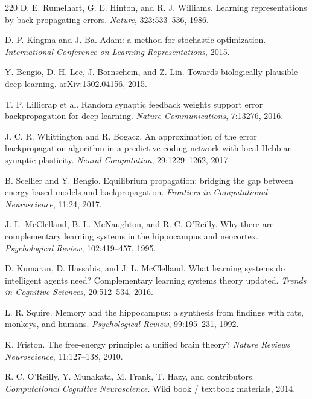\documentclass[11pt]{article}
\newcommand{\1}{\mathbf{1}}
\begin{document}
\begin{thebibliography}{220}
D. E. Rumelhart, G. E. Hinton, and R. J. Williams. Learning representations by back-propagating errors. \emph{Nature}, 323:533--536, 1986.

D. P. Kingma and J. Ba. Adam: a method for stochastic optimization. \emph{International Conference on Learning Representations}, 2015.

Y. Bengio, D.-H. Lee, J. Bornschein, and Z. Lin. Towards biologically plausible deep learning. arXiv:1502.04156, 2015.

T. P. Lillicrap et al. Random synaptic feedback weights support error backpropagation for deep learning. \emph{Nature Communications}, 7:13276, 2016.

J. C. R. Whittington and R. Bogacz. An approximation of the error backpropagation algorithm in a predictive coding network with local Hebbian synaptic plasticity. \emph{Neural Computation}, 29:1229--1262, 2017.

B. Scellier and Y. Bengio. Equilibrium propagation: bridging the gap between energy-based models and backpropagation. \emph{Frontiers in Computational Neuroscience}, 11:24, 2017.

J. L. McClelland, B. L. McNaughton, and R. C. O'Reilly. Why there are complementary learning systems in the hippocampus and neocortex. \emph{Psychological Review}, 102:419--457, 1995.

D. Kumaran, D. Hassabis, and J. L. McClelland. What learning systems do intelligent agents need? Complementary learning systems theory updated. \emph{Trends in Cognitive Sciences}, 20:512--534, 2016.

L. R. Squire. Memory and the hippocampus: a synthesis from findings with rats, monkeys, and humans. \emph{Psychological Review}, 99:195--231, 1992.

K. Friston. The free-energy principle: a unified brain theory? \emph{Nature Reviews Neuroscience}, 11:127--138, 2010.

R. C. O'Reilly, Y. Munakata, M. Frank, T. Hazy, and contributors. \emph{Computational Cognitive Neuroscience}. Wiki book / textbook materials, 2014.



\end{thebibliography}
\end{document}

